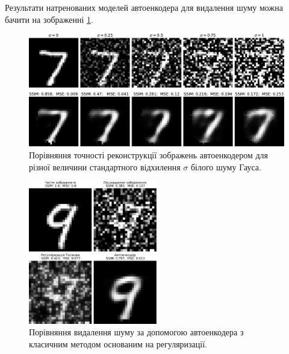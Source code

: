 \documentclass{beamer}
\numberwithin{equation}{section}
\begin{document}
	\begin{frame}
		Результати натренованих моделей автоенкодера для видалення шуму можна бачити на зображенні \ref{fig:denoising-awgn-comparation}.
		
		\begin{figure}[H]
			\centering
			\includegraphics[width=1\textwidth]{../resources/denoising-awgn-comparation.pdf}
			\caption{Порівняння точності реконструкції зображень автоенкодером для різної величини стандартного відхилення $\sigma$ білого шуму Гауса.}
			\label{fig:denoising-awgn-comparation}
		\end{figure}
	\end{frame}

	\begin{frame}
		\begin{figure}[H]
			\centering
			\includegraphics[width=0.5\textwidth]{../resources/denoising-methods-comparation.pdf}
			\caption{Порівняння видалення шуму за допомогою автоенкодера з класичним методом основаним на регуляризації.}
			\label{fig:denoising-methods-comparation}
		\end{figure}
	\end{frame}
	\begin{frame}
		\printbibliography[title={Література}]
	\end{frame}
	
	
\end{document}
